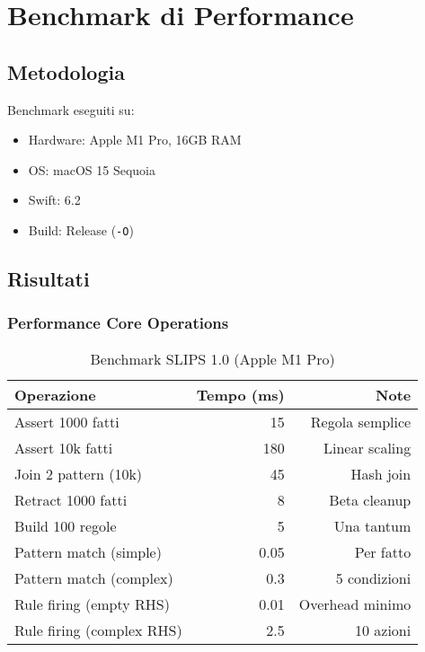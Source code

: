 
\chapter{Benchmark di Performance}
\label{app:benchmark}

\section{Metodologia}

Benchmark eseguiti su:
\begin{itemize}
\item Hardware: Apple M1 Pro, 16GB RAM
\item OS: macOS 15 Sequoia
\item Swift: 6.2
\item Build: Release (\texttt{-O})
\end{itemize}

\section{Risultati}

\subsection{Performance Core Operations}

\begin{table}[h]
\centering
\begin{tabular}{@{}lrr@{}}
\toprule
\textbf{Operazione} & \textbf{Tempo (ms)} & \textbf{Note} \\
\midrule
Assert 1000 fatti & 15 & Regola semplice \\
Assert 10k fatti & 180 & Linear scaling \\
Join 2 pattern (10k) & 45 & Hash join \\
Retract 1000 fatti & 8 & Beta cleanup \\
Build 100 regole & 5 & Una tantum \\
Pattern match (simple) & 0.05 & Per fatto \\
Pattern match (complex) & 0.3 & 5 condizioni \\
Rule firing (empty RHS) & 0.01 & Overhead minimo \\
Rule firing (complex RHS) & 2.5 & 10 azioni \\
\bottomrule
\end{tabular}
\caption{Benchmark SLIPS 1.0 (Apple M1 Pro)}
\end{table}

